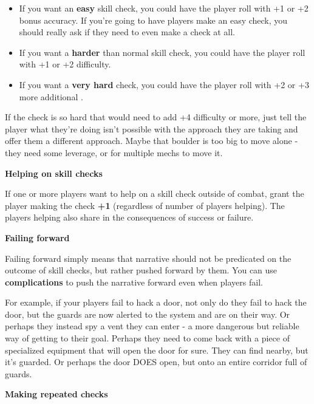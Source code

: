 \begin{itemize}
\item If you want an \textbf{easy} skill check, you could have the player roll with +1 or +2 bonus accuracy. If
you're going to have players make an easy check, you should really ask if they need to even
make a check at all.

\item If you want a \textbf{harder} than normal skill check, you could have the player roll with +1 or +2
difficulty.

\item If you want a \textbf{very hard} check, you could have the player roll with +2 or +3 more additional
\Difficulty.
\end{itemize}

If the check is so hard that would need to add +4 difficulty or more, just tell the player what
they're doing isn't possible with the approach they are taking and offer them a different
approach. Maybe that boulder is too big to move alone - they need some leverage, or for
multiple mechs to move it.

\begin{center}
\textbf{Helping on skill checks}
\end{center}

If one or more players want to help on a skill check outside of combat, grant the player making
the check \textbf{+1 \Accuracy} (regardless of number of players helping). The players helping also share
in the consequences of success or failure.

\begin{center}
\textbf{Failing forward}
\end{center}

Failing forward simply means that narrative should not be predicated on the outcome of skill
checks, but rather pushed forward by them. You can use \textbf{complications} to push the narrative
forward even when players fail.

For example, if your players fail to hack a door, not only do they fail to hack the door, but the
guards are now alerted to the system and are on their way. Or perhaps they instead spy a vent
they can enter - a more dangerous but reliable way of getting to their goal. Perhaps they need to
come back with a piece of specialized equipment that will open the door for sure. They can find
nearby, but it's guarded. Or perhaps the door DOES open, but onto an entire corridor full of
guards.

\begin{center}
\textbf{Making repeated checks}
\end{center}

